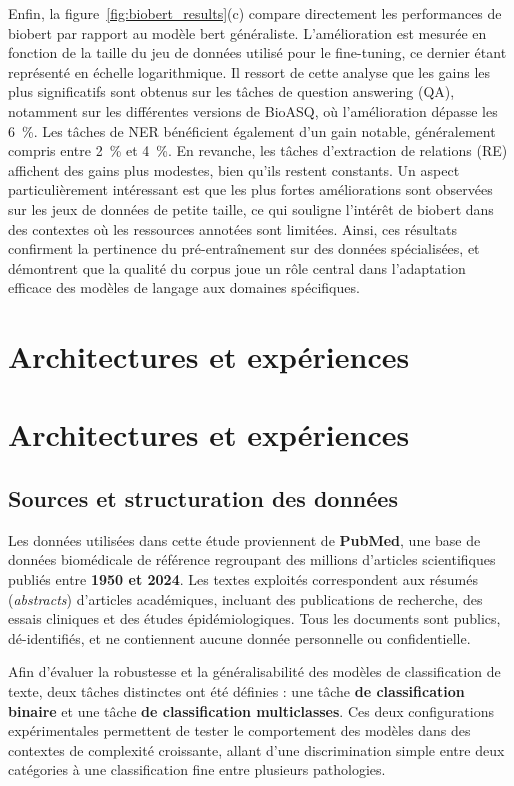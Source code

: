 \documentclass[12pt]{report}
\begin{document}
Enfin, la figure~\ref{fig:biobert_results}(c) compare directement les performances de \gls{biobert} par rapport au modèle \gls{bert} généraliste. L’amélioration est mesurée en fonction de la taille du jeu de données utilisé pour le fine-tuning, ce dernier étant représenté en échelle logarithmique. Il ressort de cette analyse que les gains les plus significatifs sont obtenus sur les tâches de question answering (QA), notamment sur les différentes versions de BioASQ, où l'amélioration dépasse les 6~\%. Les tâches de NER bénéficient également d’un gain notable, généralement compris entre 2~\% et 4~\%. En revanche, les tâches d’extraction de relations (RE) affichent des gains plus modestes, bien qu’ils restent constants. Un aspect particulièrement intéressant est que les plus fortes améliorations sont observées sur les jeux de données de petite taille, ce qui souligne l’intérêt de \gls{biobert} dans des contextes où les ressources annotées sont limitées. Ainsi, ces résultats confirment la pertinence du pré-entraînement sur des données spécialisées, et démontrent que la qualité du corpus joue un rôle central dans l’adaptation efficace des modèles de langage aux domaines spécifiques.


\newpage

\chapter{Architectures et expériences}

\chapter{Architectures et expériences}

\section{Sources et structuration des données}

Les données utilisées dans cette étude proviennent de \textbf{PubMed}, une base de données biomédicale de référence regroupant des millions d’articles scientifiques publiés entre \textbf{1950 et 2024}. Les textes exploités correspondent aux résumés (\textit{abstracts}) d’articles académiques, incluant des publications de recherche, des essais cliniques et des études épidémiologiques. Tous les documents sont publics, dé-identifiés, et ne contiennent aucune donnée personnelle ou confidentielle.

Afin d’évaluer la robustesse et la généralisabilité des modèles de classification de texte, deux tâches distinctes ont été définies : une tâche \textbf{de classification binaire} et une tâche \textbf{de classification multiclasses}. Ces deux configurations expérimentales permettent de tester le comportement des modèles dans des contextes de complexité croissante, allant d’une discrimination simple entre deux catégories à une classification fine entre plusieurs pathologies.
\end{document}
